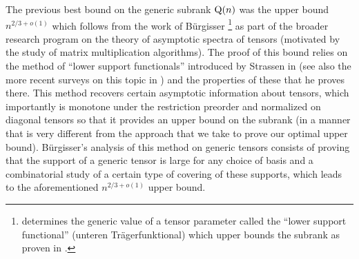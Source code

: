 \documentclass[11pt]{article}
\theoremstyle{definition}
\theoremstyle{remark}
\newcommand{\gensubrank}{{\rm Q}}
\begin{document}
The previous best bound on the generic subrank $\gensubrank(n)$ was the upper bound $n^{2/3 + o(1)}$ which follows from the work of Bürgisser \cite[Satz~2.8]{burg}\footnote{\cite[Satz~2.8]{burg} determines the generic value of a tensor parameter called the ``lower support functional'' (unteren  Trägerfunktional) which upper bounds the subrank as proven in \cite{strassen1991degeneration}.} as part of the broader research program on the theory of asymptotic spectra of tensors (motivated by the study of matrix multiplication algorithms). The proof of this bound relies on the method of ``lower support functionals'' introduced by Strassen in \cite{strassen1991degeneration} (see also the more recent surveys on this topic in \cite{christandl2017universalproc,phd,WZ}) and the properties of these that he proves there. This method recovers certain asymptotic information about tensors, which importantly is monotone under the restriction preorder and normalized on diagonal tensors so that it provides an upper bound on the subrank (in a manner that is very different from the approach that we take to prove our optimal upper bound). Bürgisser's analysis of this method on generic tensors consists of proving that the support of a generic tensor is large for any choice of basis and a combinatorial study of a certain type of covering of these supports, which leads to the aforementioned $n^{2/3 + o(1)}$ upper bound.
\end{document}
